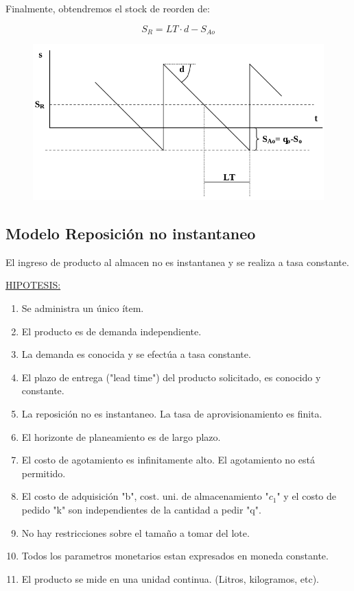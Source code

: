 \documentclass{article}
\begin{document}
Finalmente, obtendremos el stock de reorden de:

\begin{equation}
    S_R = LT \cdot d - S_{Ao}
\end{equation}


\begin{figure}[h!]
    \includegraphics[width=\linewidth]{imagenes/stock-reorden-agotamiento.png}
\end{figure}

\newpage
\subsection{Modelo Reposición no instantaneo}

El ingreso de producto al almacen no es instantanea y se realiza a tasa constante.


\noindent
\underline{HIPOTESIS:}
\begin{enumerate}
    \item Se administra un único ítem.
    \item El producto es de demanda independiente.
    \item La demanda es conocida y se efectúa a tasa constante.
    \item El plazo de entrega ("lead time") del producto solicitado, es conocido y constante.
    \item La reposición no es instantaneo. La tasa de aprovisionamiento es finita.
    \item El horizonte de planeamiento es de largo plazo.
    \item El costo de agotamiento es infinitamente alto. El agotamiento no está permitido.
    \item El costo de adquisición "b", cost. uni. de almacenamiento "\(c_1\)" y el costo de pedido "k" son independientes de la cantidad a pedir "q".
    \item No hay restricciones sobre el tamaño a tomar del lote.
    \item Todos los parametros monetarios estan expresados en moneda constante.
    \item El producto se mide en una unidad continua. (Litros, kilogramos, etc).
\end{enumerate}
\end{document}
